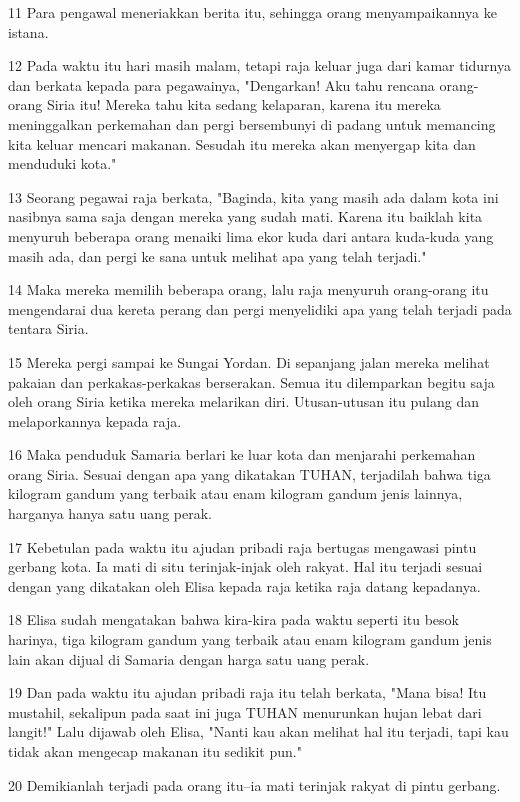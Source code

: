 \par 11 Para pengawal meneriakkan berita itu, sehingga orang menyampaikannya ke istana.
\par 12 Pada waktu itu hari masih malam, tetapi raja keluar juga dari kamar tidurnya dan berkata kepada para pegawainya, "Dengarkan! Aku tahu rencana orang-orang Siria itu! Mereka tahu kita sedang kelaparan, karena itu mereka meninggalkan perkemahan dan pergi bersembunyi di padang untuk memancing kita keluar mencari makanan. Sesudah itu mereka akan menyergap kita dan menduduki kota."
\par 13 Seorang pegawai raja berkata, "Baginda, kita yang masih ada dalam kota ini nasibnya sama saja dengan mereka yang sudah mati. Karena itu baiklah kita menyuruh beberapa orang menaiki lima ekor kuda dari antara kuda-kuda yang masih ada, dan pergi ke sana untuk melihat apa yang telah terjadi."
\par 14 Maka mereka memilih beberapa orang, lalu raja menyuruh orang-orang itu mengendarai dua kereta perang dan pergi menyelidiki apa yang telah terjadi pada tentara Siria.
\par 15 Mereka pergi sampai ke Sungai Yordan. Di sepanjang jalan mereka melihat pakaian dan perkakas-perkakas berserakan. Semua itu dilemparkan begitu saja oleh orang Siria ketika mereka melarikan diri. Utusan-utusan itu pulang dan melaporkannya kepada raja.
\par 16 Maka penduduk Samaria berlari ke luar kota dan menjarahi perkemahan orang Siria. Sesuai dengan apa yang dikatakan TUHAN, terjadilah bahwa tiga kilogram gandum yang terbaik atau enam kilogram gandum jenis lainnya, harganya hanya satu uang perak.
\par 17 Kebetulan pada waktu itu ajudan pribadi raja bertugas mengawasi pintu gerbang kota. Ia mati di situ terinjak-injak oleh rakyat. Hal itu terjadi sesuai dengan yang dikatakan oleh Elisa kepada raja ketika raja datang kepadanya.
\par 18 Elisa sudah mengatakan bahwa kira-kira pada waktu seperti itu besok harinya, tiga kilogram gandum yang terbaik atau enam kilogram gandum jenis lain akan dijual di Samaria dengan harga satu uang perak.
\par 19 Dan pada waktu itu ajudan pribadi raja itu telah berkata, "Mana bisa! Itu mustahil, sekalipun pada saat ini juga TUHAN menurunkan hujan lebat dari langit!" Lalu dijawab oleh Elisa, "Nanti kau akan melihat hal itu terjadi, tapi kau tidak akan mengecap makanan itu sedikit pun."
\par 20 Demikianlah terjadi pada orang itu--ia mati terinjak rakyat di pintu gerbang.

